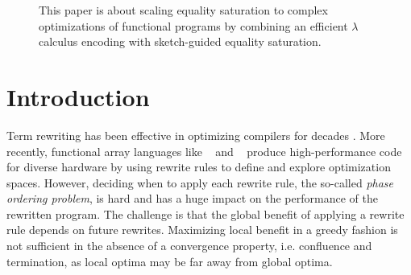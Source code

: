 
\begin{figure}[b]
    \centering
{}
\caption{This paper is about scaling equality saturation to complex optimizations of functional programs by combining an efficient $\lambda$ calculus encoding with sketch-guided equality saturation.}
    \label{fig:overview}
\end{figure}

\section{Introduction}

Term rewriting has been effective in optimizing compilers for decades \cite{dershowitz1993-rewrite-systems}.
More recently, functional array languages like \Lift{}~\cite{lift-rewrite-2015} and \Rise{}~\cite{hagedorn2020-elevate} produce high-performance code for diverse hardware by using rewrite rules to define and explore optimization spaces.
However, deciding when to apply each rewrite rule, the so-called \emph{phase ordering problem}, is hard and has a huge impact on the performance of the rewritten program.
The challenge is that the global benefit of applying a rewrite rule depends on future rewrites.
Maximizing local benefit in a greedy fashion is not sufficient in the absence of a convergence property, i.e. confluence and termination, as local optima may be far away from global optima.

